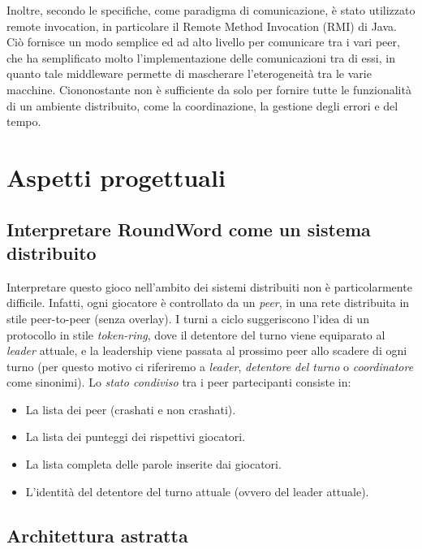\documentclass[10.5pt]{article}
\begin{document}
Inoltre, secondo le specifiche, come paradigma di comunicazione, è stato utilizzato remote invocation, in particolare il Remote Method Invocation (RMI) di Java. Ciò fornisce un modo semplice ed ad alto livello per comunicare tra i vari peer, che ha semplificato molto l'implementazione delle comunicazioni tra di essi, in quanto tale middleware permette di mascherare l'eterogeneità tra le varie macchine. Ciononostante non è sufficiente da solo per fornire tutte le funzionalità di un ambiente distribuito, come la coordinazione, la gestione degli errori e del tempo.

\section{Aspetti progettuali}

\subsection{Interpretare RoundWord come un sistema distribuito}
Interpretare questo gioco nell'ambito dei sistemi distribuiti non è particolarmente difficile. Infatti, ogni giocatore è controllato da un \emph{peer}, in una rete distribuita in stile peer-to-peer (senza overlay). I turni a ciclo suggeriscono l'idea di un protocollo in stile \emph{token-ring}, dove il detentore del turno viene equiparato al \emph{leader} attuale, e la leadership viene passata al prossimo peer allo scadere di ogni turno (per questo motivo ci riferiremo a \emph{leader}, \emph{detentore del turno} o \emph{coordinatore} come sinonimi). Lo \emph{stato condiviso} tra i peer partecipanti consiste in:
\begin{itemize}
\item La lista dei peer (crashati e non crashati).
\item La lista dei punteggi dei rispettivi giocatori.
\item La lista completa delle parole inserite dai giocatori.
\item L'identità del detentore del turno attuale (ovvero del leader attuale).
\end{itemize}


\subsection{Architettura astratta}
\end{document}
